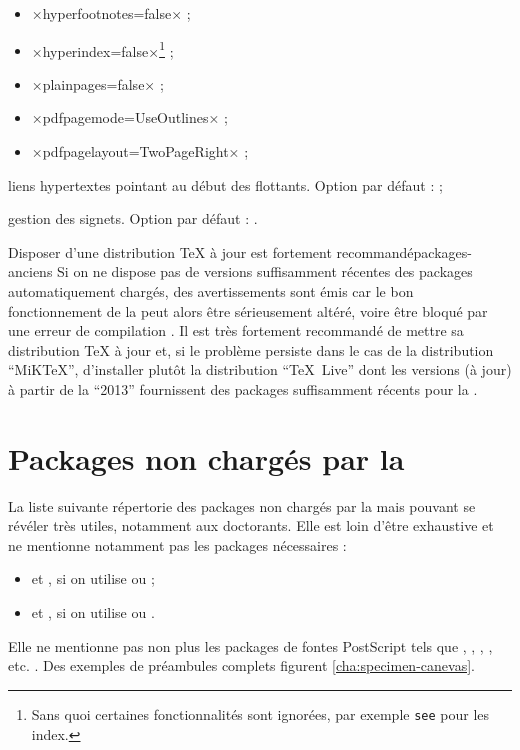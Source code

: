 \begin{description}
\begin{itemize}
  \item ×hyperfootnotes=false× ;
  \item ×hyperindex=false×\footnote{Sans quoi certaines fonctionnalités sont
      ignorées, par exemple \protect\lstinline|see| pour les index.} ;
  \item ×plainpages=false× ;
  \item ×pdfpagemode=UseOutlines× ;
  \item ×pdfpagelayout=TwoPageRight× ;
  \end{itemize}
\item[\package{hypcap} :] liens hypertextes pointant au début des
  flottants\ifscreenoutput. Option par défaut :  ;
\item[\package{bookmark} :] gestion des signets\ifscreenoutput. Option par
  défaut : .
\end{description}

\begin{dbremark}{Disposer d'une distribution \TeX{} à jour est fortement
    recommandé}{packages-anciens}
  Si on ne dispose pas de versions suffisamment récentes des packages
  automatiquement chargés, des avertissements sont émis car le bon
  fonctionnement de la \yatcl{} peut alors être sérieusement altéré, voire être
  bloqué par une erreur de compilation . Il
  est très fortement recommandé de mettre sa distribution \TeX{} à jour et, si
  le problème persiste dans le cas de la distribution \enquote{MiK\TeX{}},
  d'installer plutôt la distribution \enquote{\TeX~Live} dont les versions (à
  jour) à partir de la \enquote{2013} fournissent des packages suffisamment
  récents pour la \yatcl.
\end{dbremark}

\section{Packages non chargés par la \yatcl{}}

La liste suivante répertorie des packages non chargés par la \yatcl{} mais
pouvant se révéler très utiles, notamment aux doctorants.  Elle est loin d'être
exhaustive et ne mentionne notamment pas les packages nécessaires :
\begin{itemize}
\item {} et , si on utilise  ou
   ;
\item {} et , si on utilise 
  ou .
\end{itemize}
Elle ne mentionne pas non plus les packages de fontes PostScript tels que
, , , ,
etc. . Des exemples de préambules complets figurent
\vref{cha:specimen-canevas}.

